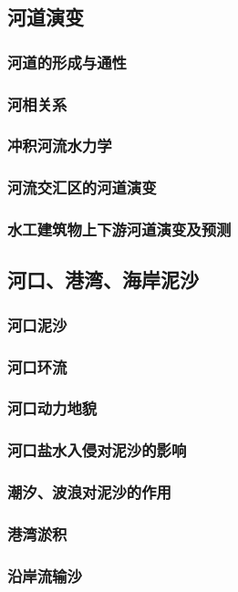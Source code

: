\documentclass[UTF8]{../../ApplicationUniverse}
\begin{document}
    \subsection{河道演变}
        \subsubsection{河道的形成与通性}
        \subsubsection{河相关系}
        \subsubsection{冲积河流水力学}
        \subsubsection{河流交汇区的河道演变}
        \subsubsection{水工建筑物上下游河道演变及预测}
    \subsection{河口、港湾、海岸泥沙}
        \subsubsection{河口泥沙}
        \subsubsection{河口环流}
        \subsubsection{河口动力地貌}
        \subsubsection{河口盐水入侵对泥沙的影响}
        \subsubsection{潮汐、波浪对泥沙的作用}
        \subsubsection{港湾淤积}
        \subsubsection{沿岸流输沙}
\end{document}
